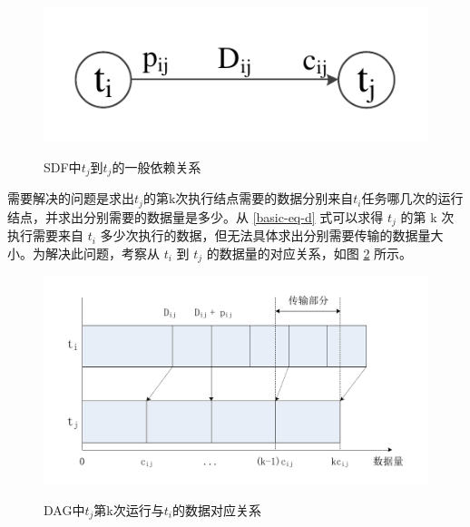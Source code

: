\begin{figure}[!hbt]
  \centering
  \includegraphics[height=8ex]{figure/DLS-gendep.pdf}\\
  \caption{SDF中$t_j$到$t_j$的一般依赖关系}\label{DLS-fig-gendep}
\end{figure}

需要解决的问题是求出$t_j$的第k次执行结点需要的数据分别来自$t_i$任务哪几次的运行结点，并求出分别需要的数据量是多少。从 \eqref{basic-eq-d} 式可以求得 $t_j$ 的第 k 次执行需要来自 $t_i$ 多少次执行的数据，但无法具体求出分别需要传输的数据量大小。为解决此问题，考察从 $t_i$ 到 $t_j$ 的数据量的对应关系，如图 \ref{DAG-fig-innerp-data} 所示。%

\begin{figure}[!hbt]
  \centering
  \includegraphics[height=30ex]{figure/DAG-innerp-data.pdf}\\
  \caption{DAG中$t_j$第k次运行与$t_i$的数据对应关系}\label{DAG-fig-innerp-data}
\end{figure}

